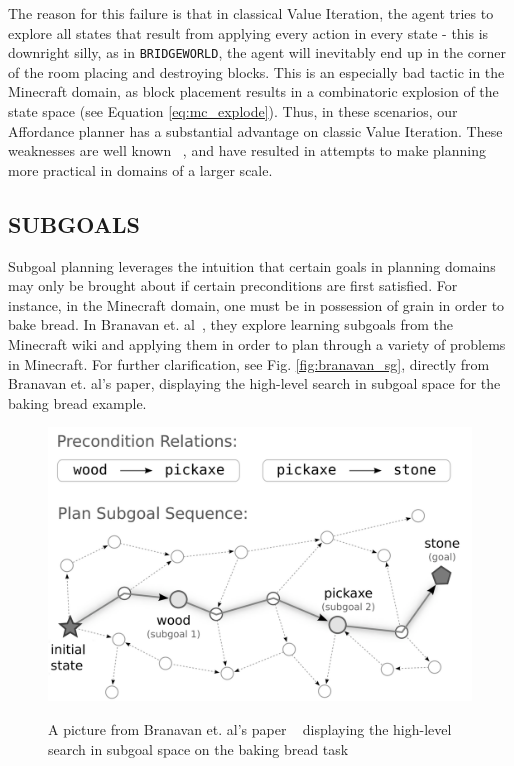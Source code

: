 \documentclass[]{article}
\begin{document}
The reason for this failure is that in classical Value Iteration, the agent tries to 
explore all states that result from applying every action in every state - this is downright silly, 
as in \texttt{BRIDGEWORLD}, the agent will inevitably end up in the corner of the 
room placing and destroying blocks. This is an especially bad tactic in the Minecraft 
domain, as block placement results in a combinatoric explosion of the state space 
(see Equation \ref{eq:mc_explode}). Thus, in these scenarios, our Affordance planner 
has a substantial advantage on classic Value Iteration. These weaknesses are well 
known ~\citep{grounds05}, and have resulted in attempts to make planning more 
practical in domains of a larger scale.


\subsection{SUBGOALS}
Subgoal planning leverages the intuition that certain goals in planning domains 
may only be brought about if certain preconditions are first satisfied. For instance, 
in the Minecraft domain, one must be in possession of grain in order to bake bread.
In Branavan et. al~\citep{branavan12a}, they explore learning subgoals from the 
Minecraft wiki and applying them in order to plan through a variety of problems in Minecraft.
For further clarification, see Fig. \ref{fig:branavan_sg}, directly from Branavan
et. al's paper, displaying the high-level search in subgoal space for the baking bread example.

\begin{figure}
\centering
\includegraphics[scale=0.27]{figures/branavan_sg.png}
\label{fig:branavan_sg.png}
\caption{A picture from Branavan et. al's paper ~\citep{branavan12a} displaying the high-level search in subgoal space on the baking bread task}
\end{figure}
\end{document}

